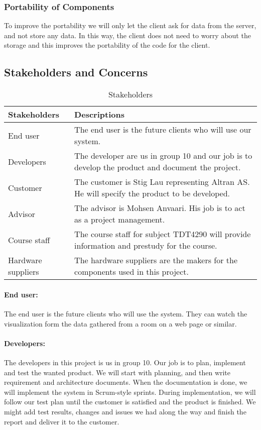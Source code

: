 \documentclass[../document.tex]{subfiles}
\begin{document}
\subsubsection{Portability of Components}
To improve the portability we will only let the client ask for data from the server, and not store any data. In this way, the client does not need to worry about the storage and this improves the portability of the code for the client.

\subsection{Stakeholders and Concerns}
\begin{table}[H]
	\caption{Stakeholders}
	\begin{tabularx}{\textwidth}{|X|X|}
		\hline
		\textbf{Stakeholders}	& \textbf{Descriptions} \\ \hline
		End user				& The end user is the future clients who will use our system.  \\ \hline
		Developers				& The developer are us in group 10 and our job is to develop the product and document the project.  \\ \hline
		Customer				& The customer is Stig Lau representing Altran AS. He will specify the product to be developed.  \\ \hline
		Advisor					& The advisor is Mohsen Anvaari. His job is to act as a project management.  \\ \hline
		Course staff			& The course staff for subject TDT4290 will provide information and prestudy for the course.  \\ \hline
		Hardware suppliers		& The hardware suppliers are the makers for the components used in this project.  \\ \hline
	\end{tabularx}
\end{table}

\paragraph{End user:} The end user is the future clients who will use the system. They can watch the visualization form the data gathered from a room on a web page or similar. 

\paragraph{Developers:} The developers in this project is us in group 10. Our job is to plan, implement and test the wanted product. We will start with planning, and then write requirement and architecture documents. When the documentation is done, we will implement the system in Scrum-style sprints. During implementation, we will follow our test plan until the customer is satisfied and the product is finished. We might add test results, changes and issues we had along the way and finish the report and deliver it to the customer.
\end{document}
